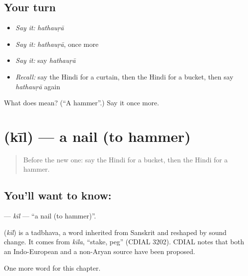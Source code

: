 \subsection*{Your turn}
\begin{itemize}
\raggedright
  \item \emph{Say it:} \emph{hathauṛā}
  \item \emph{Say it:} \emph{hathauṛā}, once more
  \item \emph{Say it:} say \emph{hathauṛā}
  \item \emph{Recall:} say the Hindi for a curtain, then the Hindi for a bucket, then say \emph{hathauṛā} again
\end{itemize}

\begin{tcolorbox}[breakable,colback=teal!4,colframe=teal!35!black,title={Before you move on}]
What does  mean? (\textquotedblleft{}A hammer\textquotedblright{}.) Say it once more.
\end{tcolorbox}
\section[\texorpdfstring{\hi{कील} (kīl)}{कील (kīl)}]{ (kīl) — a nail (to hammer)}

\label{lesson:HI-C130-kil}



\begin{quote}
Before the new one: say the Hindi for a bucket, then the Hindi for a hammer.
\end{quote}

\subsection*{You'll want to know: }
\textbf{} — \emph{kīl} — \textquotedblleft{}a nail (to hammer)\textquotedblright{}.

\begin{cousinweb}
\textbf{} (\emph{kīl}) is a tadbhava, a word inherited from Sanskrit and reshaped by sound change. It comes from \emph{kīla}, \textquotedblleft{}stake, peg\textquotedblright{} (CDIAL 3202). CDIAL notes that both an Indo-European and a non-Aryan source have been proposed.
\end{cousinweb}

\begin{grammarlens}[title={What you've built}]
One more word for this chapter.
\end{grammarlens}

